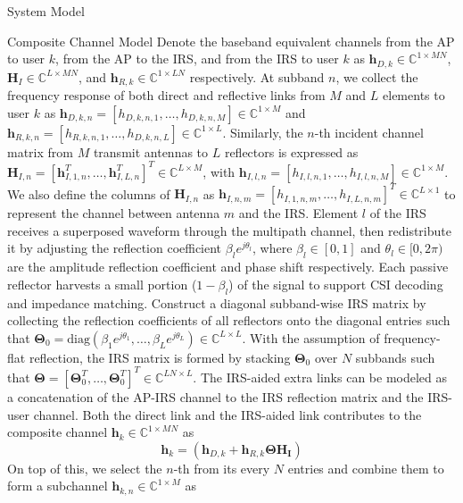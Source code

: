 \documentclass{IEEEtran}
\begin{document}
\begin{section} {System Model}
\begin{subsection}	{Composite Channel Model}
		Denote the baseband equivalent channels from the AP to user $k$, from the AP to the IRS, and from the IRS to user $k$ as $\boldsymbol{h}_{D,k} \in \mathbb{C}^{1 \times MN}$, $\boldsymbol{H}_I \in \mathbb{C}^{L \times MN}$, and $\boldsymbol{h}_{R,k} \in \mathbb{C}^{1 \times LN}$ respectively. At subband $n$, we collect the frequency response of both direct and reflective links from $M$ and $L$ elements to user $k$ as $\boldsymbol{h}_{D,k,n}=[h_{D,k,n,1},\dots,h_{D,k,n,M}] \in \mathbb{C}^{1 \times M}$ and $\boldsymbol{h}_{R,k,n}=[h_{R,k,n,1},\dots,h_{D,k,n,L}] \in \mathbb{C}^{1 \times L}$. Similarly, the $n$-th incident channel matrix from $M$ transmit antennas to $L$ reflectors is expressed as $\boldsymbol{H}_{I,n}=[\boldsymbol{h}_{I,1,n}^T,\dots,\boldsymbol{h}_{I,L,n}^T]^T \in \mathbb{C}^{L \times M}$, with $\boldsymbol{h}_{I,l,n}=[h_{I,l,n,1},\dots,h_{I,l,n,M}] \in \mathbb{C}^{1 \times M}$. We also define the columns of $\boldsymbol{H}_{I,n}$ as $\boldsymbol{h}_{I,n,m}=[h_{I,1,n,m},\dots,h_{I,L,n,m}]^T \in \mathbb{C}^{L \times 1}$ to represent the channel between antenna $m$ and the IRS. Element $l$ of the IRS receives a superposed waveform through the multipath channel, then redistribute it by adjusting the reflection coefficient $\beta_l e^{j \theta_l}$, where $\beta_l \in [0,1]$ and $\theta_l \in [0,2\pi)$ are the amplitude reflection coefficient and phase shift respectively. Each passive reflector harvests a small portion ($1 - \beta_l$) of the signal to support CSI decoding and impedance matching. Construct a diagonal subband-wise IRS matrix by collecting the reflection coefficients of all reflectors onto the diagonal entries such that $\boldsymbol{\Theta}_0 = \text{diag}(\beta_1 e^{j \theta_1}, \dots, \beta_L e^{j \theta_L}) \in \mathbb{C}^{L \times L}$. With the assumption of frequency-flat reflection, the IRS matrix is formed by stacking $\boldsymbol{\Theta}_0$ over $N$ subbands such that $\boldsymbol{\Theta} = [\boldsymbol{\Theta}_0^T,\dots,\boldsymbol{\Theta}_0^T]^T \in \mathbb{C}^{LN \times L}$. The IRS-aided extra links can be modeled as a concatenation of the AP-IRS channel to the IRS reflection matrix and the IRS-user channel. Both the direct link and the IRS-aided link contributes to the composite channel $\boldsymbol{h}_k \in \mathbb{C}^{1 \times MN}$ as
		\begin{equation}	\label{eq:h_k}
			\boldsymbol{h}_k = \left( \boldsymbol{h}_{D,k}+\boldsymbol{h}_{R,k} \boldsymbol{\Theta} \boldsymbol{\boldsymbol{H}_I} \right)
		\end{equation}
		On top of this, we select the $n$-th from its every $N$ entries and combine them to form a subchannel $\boldsymbol{h}_{k,n} \in \mathbb{C}^{1 \times M}$ as

\end{subsection}
\end{section}
\end{document}
